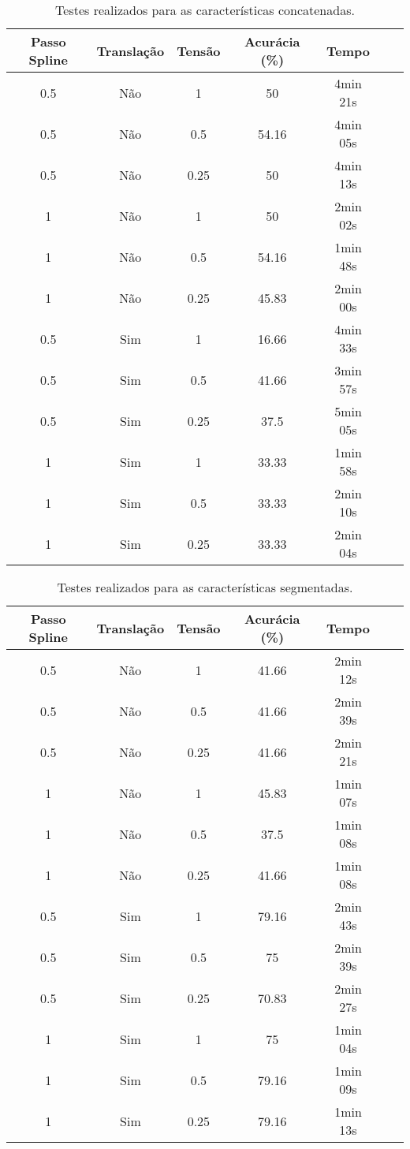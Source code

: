 \begin{table}[h!]
    \centering
    \caption{Testes realizados para as características concatenadas.}
    \begin{tabular}{|c|c|c|c|c|c|c|}
    \hline
    \textbf{Passo Spline} & \textbf{Translação} & \textbf{Tensão} & \textbf{Acurácia (\%)} & \textbf{Tempo} \\
    \hline
    0.5 & Não & 1 & 50 & 4min 21s\\
    0.5 & Não & 0.5 & 54.16 & 4min 05s\\
    0.5 & Não & 0.25 & 50 & 4min 13s\\

    1 & Não & 1 & 50 & 2min 02s\\
    1 & Não & 0.5 & 54.16 & 1min 48s\\
    1 & Não & 0.25 & 45.83 & 2min 00s\\

    0.5 & Sim & 1 & 16.66 & 4min 33s \\
    0.5 & Sim & 0.5 & 41.66 & 3min 57s \\
    0.5 & Sim & 0.25 & 37.5 & 5min 05s\\

    1 & Sim & 1 & 33.33 & 1min 58s \\
    1 & Sim & 0.5 & 33.33 & 2min 10s \\
    1 & Sim & 0.25 & 33.33 & 2min 04s \\
    \hline
    \end{tabular}
\end{table}

\begin{table}[h!]
    \centering
    \caption{Testes realizados para as características segmentadas.}
    \begin{tabular}{|c|c|c|c|c|c|c|}
    \hline
    \textbf{Passo Spline} & \textbf{Translação} & \textbf{Tensão} & \textbf{Acurácia (\%)} & \textbf{Tempo} \\
    \hline

    0.5 & Não & 1 & 41.66 & 2min 12s \\
    0.5 & Não & 0.5 & 41.66 & 2min 39s \\
    0.5 & Não & 0.25 & 41.66 & 2min 21s \\

    1 & Não & 1 & 45.83 & 1min 07s \\
    1 & Não & 0.5 & 37.5 & 1min 08s \\
    1 & Não & 0.25 & 41.66 & 1min 08s \\

    0.5 & Sim & 1 & 79.16 & 2min 43s \\
    0.5 & Sim & 0.5 & 75 & 2min 39s \\
    0.5 & Sim & 0.25 & 70.83 & 2min 27s \\
 
    1 & Sim & 1 & 75 & 1min 04s \\
    1 & Sim & 0.5 & 79.16 & 1min 09s \\
    1 & Sim & 0.25 & 79.16 & 1min 13s \\
    \hline
    \end{tabular}
\end{table}
